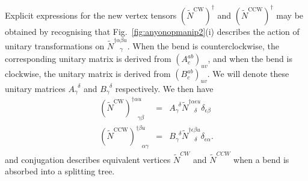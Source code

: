 \documentclass[aps,prb,reprint,superscriptaddress,amsfonts,amsmath,amssymb,showpacs,floatfix]{revtex4-1}
\newcommand{\mrm}[1]{\mathrm{#1}}
\newcommand{\fref}[1]{Fig.~\ref{#1}}
\newcommand{\p}[1]{\phantom{#1}}
\begin{document}
Explicit expressions for the new vertex tensors $(\tilde N^\mrm{CW})^\dagger$ and $(\tilde N^\mrm{CCW})^\dagger$ may be obtained by recognising that \fref{fig:anyonopmanip2}(i) describes the action of unitary transformations %
on $\tilde N^{\dagger\alpha\beta u}_{\p\dagger\gamma}$. When the bend is counterclockwise, the corresponding unitary matrix is derived from $(A^{ab}_c)_{uv}$, and when the bend is clockwise, the unitary matrix is derived from $(B^{ab}_c)_{uv}$. We will denote these unitary matrices $A_\gamma^{\p\gamma\delta}$ and $B_\gamma^{\p\gamma\delta}$ respectively.
%
We then have
\begin{eqnarray}
(\tilde N^\mrm{CW})^{\dagger\alpha u}_{\p\dagger\gamma\beta}&=&A_\gamma^{\p\gamma\delta}\tilde N^{\dagger\alpha\epsilon u}_{\p\dagger\delta}\delta_{\epsilon\beta}\label{eq:Nbend}\\
(\tilde N^\mrm{CCW})^{\dagger\beta u}_{\p\dagger\alpha\gamma}&=&B_\gamma^{\p\gamma\delta}\tilde N^{\dagger\epsilon\beta u}_{\p\dagger\delta}\delta_{\epsilon\alpha}.\label{eq:Nbend2}
\end{eqnarray}
and conjugation describes equivalent vertices $\tilde N^{CW}$ and $\tilde N^{CCW}$ when a bend is absorbed into a splitting tree. 
\end{document}
